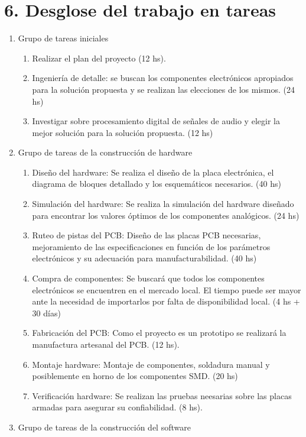 \documentclass[11pt]{charter}
\begin{document}
\section{6. Desglose del trabajo en tareas}
\label{sec:wbs}

\begin{enumerate}
\item Grupo de tareas iniciales
	\begin{enumerate}
	\item Realizar el plan del proyecto (12 hs).
	\item Ingeniería de detalle: se buscan los componentes electrónicos apropiados para la solución propuesta y se realizan las elecciones de los mismos. (24 hs)
	\item Investigar sobre procesamiento digital de señales de audio y elegir la mejor solución para la solución propuesta. (12 hs)
	\end{enumerate}
\item Grupo de tareas de la construcción de hardware
	\begin{enumerate}
	\item Diseño del hardware: Se realiza el diseño de la placa electrónica, el diagrama de
bloques detallado y los esquemáticos necesarios. (40 hs)
    \item Simulación del hardware: Se realiza la simulación del hardware diseñado para encontrar los valores óptimos de los componentes analógicos. (24 hs)
    \item Ruteo de pistas del PCB: Diseño de las placas PCB necesarias, mejoramiento de las especificaciones en función de los parámetros electrónicos y su adecuación para manufacturabilidad. (40 hs)
    \item Compra de componentes: Se buscará que todos los componentes electrónicos se encuentren en el mercado local. El tiempo puede ser mayor ante la necesidad de importarlos por falta de disponibilidad local. (4 hs + 30 días)
    \item Fabricación del PCB: Como el proyecto es un prototipo se realizará la manufactura artesanal del PCB. (12 hs).
    \item Montaje hardware: Montaje de componentes, soldadura manual y posiblemente en horno de los componentes SMD. (20 hs)
    \item Verificación hardware: Se realizan las pruebas neesarias sobre las placas armadas para asegurar su confiabilidad. (8 hs).
	\end{enumerate}
\item Grupo de tareas de la construcción del software

\end{enumerate}
\end{document}

